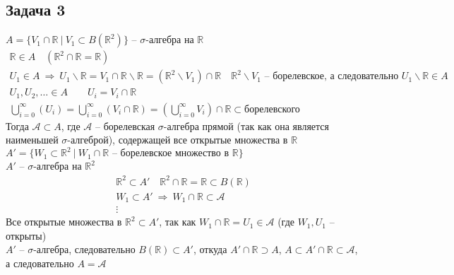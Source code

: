 \subsection*{Задача 3}
	$A = \{V_1 \cap \mathbb{R}\ |\ V_1 \subset B(\mathbb{R}^2)\}$ -- $\sigma$-алгебра на $\mathbb{R}$
	\begin{gather*}
	\mathbb{R} \in A\quad (\mathbb{R}^2 \cap \mathbb{R} = \mathbb{R})\\
	U_1 \in A\ \Rightarrow\ U_1 \backslash \mathbb{R} = V_1 \cap \mathbb{R} \backslash \mathbb{R} = (\mathbb{R}^2 \backslash V_1) \cap \mathbb{R}\quad \mathbb{R}^2 \backslash V_1 \text{ -- борелевское, а следовательно } U_1 \backslash \mathbb{R} \in A\\
	U_1, U_2, \ldots \in A\qquad U_i = V_i \cap \mathbb{R}\\
	\bigcup\limits_{i=0}^{\infty} (U_i) = \bigcup\limits_{i = 0}^{\infty} (V_i \cap \mathbb{R}) = \left(\bigcup\limits_{i = 0}^{\infty} V_i\right) \cap \mathbb{R} \subset \text{борелевского}
	\end{gather*}
	Тогда $\mathcal{A} \subset A$, где $\mathcal{A}$ -- борелевская $\sigma$-алгебра прямой (так как она является наименьшей $\sigma$-алгеброй), содержащей все открытые множества в $\mathbb{R}$\\
	$A' = \{ W_1 \subset \mathbb{R}^2\ |\ W_1 \cap \mathbb{R} \text{ -- борелевское множество в } \mathbb{R}\}$\\
	$A'$ -- $\sigma$-алгебра на $\mathbb{R}^2$
	\begin{gather*}
	\mathbb{R}^2 \subset A'\quad \mathbb{R}^2 \cap \mathbb{R} = \mathbb{R} \subset B(\mathbb{R})\\
	W_1 \subset A'\ \Rightarrow\ W_1 \cap \mathbb{R} \subset \mathcal{A}\\
	\vdots
	\end{gather*}
	Все открытые множества в $\mathbb{R}^2 \subset A'$, так как $W_1 \cap \mathbb{R} = U_1 \in \mathcal{A}$ (где $W_1, U_1$ -- открыты)\\
	$A'$ -- $\sigma$-алгебра, следовательно $B(\mathbb{R}) \subset A'$, откуда $A' \cap \mathbb{R} \supset A$, $A \subset A' \cap \mathbb{R} \subset \mathcal{A}$, а следовательно $A = \mathcal{A}$

\begin{comment}
	Докажем что совокупность пересечений борелевских подмножеств плоскости с прямой есть в точности борелевская $\sigma$-алгебра прямой\\
	\begin{gather*}
	A = \{B_2 \cap \mathbb{R}\ |\ B_2 \text{-- борелевское подмножество } \mathbb{R}^2\}\quad A -- \sigma\text{-алгебра}\\
	\mathbb{R}^2 \cap \mathbb{R} = \mathbb{R} \in A\\
	A_1 \in A\ \Leftrightarrow\ A_1 = B_2 \cap \mathbb{R}\ \Rightarrow
	\end{gather*}
\end{comment}


